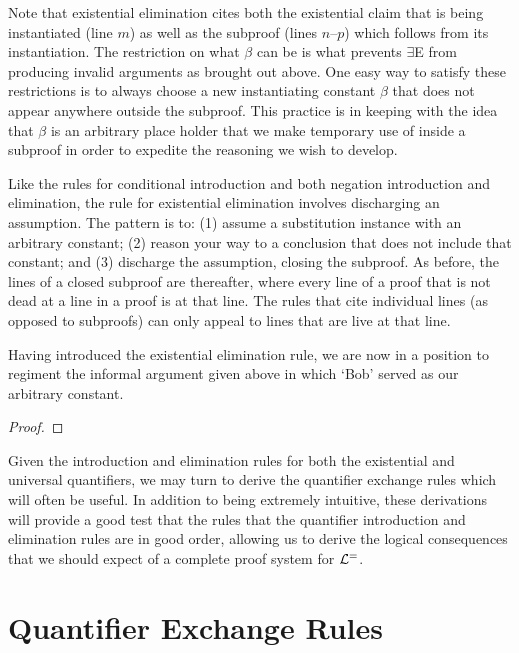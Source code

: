Note that existential elimination cites both the existential claim that is being instantiated (line $m$) as well as the subproof (lines $n$--$p$) which follows from its instantiation.
The restriction on what $\beta$ can be is what prevents $\exists$E from producing invalid arguments as brought out above. 
One easy way to satisfy these restrictions is to always choose a new instantiating constant $\beta$ that does not appear anywhere outside the subproof. 
This practice is in keeping with the idea that $\beta$ is an arbitrary place holder that we make temporary use of inside a subproof in order to expedite the reasoning we wish to develop.

Like the rules for conditional introduction and both negation introduction and elimination, the rule for existential elimination involves discharging an assumption.
The pattern is to: (1) assume a substitution instance with an arbitrary constant; (2) reason your way to a conclusion that does not include that constant; and (3) discharge the assumption, closing the subproof.
As before, the lines of a closed subproof are  thereafter, where every line of a proof that is not dead at a line in a proof is  at that line.
The rules that cite individual lines (as opposed to subproofs) can only appeal to lines that are live at that line.

Having introduced the existential elimination rule, we are now in a position to regiment the informal argument given above in which `Bob' served as our arbitrary constant.

\begin{proof}
	 \pr{}
	 \pr{} 
	\open
		 
		 
	\close
\end{proof}

Given the introduction and elimination rules for both the existential and universal quantifiers, we may turn to derive the quantifier exchange rules which will often be useful.
In addition to being extremely intuitive, these derivations will provide a good test that the rules that the quantifier introduction and elimination rules are in good order, allowing us to derive the logical consequences that we should expect of a complete proof system for $\mathcal{L}^{=}$.




\section{Quantifier Exchange Rules}
  \label{QER}

